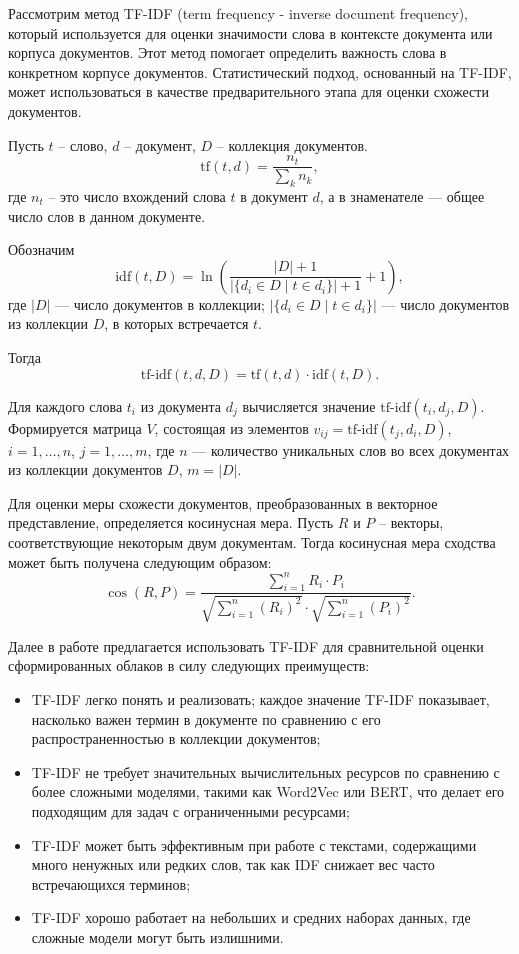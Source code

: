 \documentclass[bachelor, och, coursework ]{SCWorks}
\begin{document}
Рассмотрим метод TF-IDF (term frequency - inverse document frequency), который используется для оценки значимости слова в контексте документа или корпуса документов. Этот метод помогает определить важность слова в конкретном корпусе документов. Статистический подход, основанный на TF-IDF, может использоваться в качестве предварительного этапа для оценки схожести документов.


Пусть \( t \) – слово, \( d \) – документ, \( D \) – коллекция документов.
\[
\text{tf}(t,d) = \frac{n_t}{\sum_{k} n_k},
\]
где \( n_t \) – это число вхождений слова \( t \) в документ \( d \), а в знаменателе — общее число слов в данном документе.

Обозначим
\[
\text{idf}(t,D) = \ln \left( \frac{|D| + 1}{|\{d_i \in D \mid t \in d_i\}| + 1} + 1 \right),
\]
где \( |D| \) — число документов в коллекции; \( |\{d_i \in D \mid t \in d_i\}| \) — число документов из коллекции \( D \), в которых встречается \( t \).

Тогда
\[
\text{tf-idf}(t,d,D) = \text{tf}(t,d) \cdot \text{idf}(t,D).
\]

Для каждого слова \( t_i \) из документа \( d_j \) вычисляется значение \( \text{tf-idf}(t_i,d_j,D) \). Формируется матрица \( V \), состоящая из элементов \( v_{ij} = \text{tf-idf}(t_j, d_i, D) \), \( i = 1, \ldots, n \), \( j = 1, \ldots, m \), где \( n \) — количество уникальных слов во всех документах из коллекции документов \( D \), \( m = |D| \).

Для оценки меры схожести документов, преобразованных в векторное представление, определяется косинусная мера. Пусть \( R \) и \( P \) – векторы, соответствующие некоторым двум документам. Тогда косинусная мера сходства может быть получена следующим образом:
\[
\cos(R,P) = \frac{\sum_{i=1}^n R_i \cdot P_i}{\sqrt{\sum_{i=1}^n (R_i)^2} \cdot \sqrt{\sum_{i=1}^n (P_i)^2}}.
\]


Далее в работе предлагается использовать TF-IDF для сравнительной оценки сформированных облаков в силу следующих преимуществ:
\begin{itemize}
    \item TF-IDF легко понять и реализовать; каждое значение TF-IDF  показывает, насколько важен термин в документе по сравнению с его распространенностью в коллекции документов;
    \item TF-IDF не требует значительных вычислительных ресурсов по сравнению с более сложными моделями, такими как Word2Vec или BERT, что делает его подходящим для задач с ограниченными ресурсами;
    \item TF-IDF может быть эффективным при работе с текстами, содержащими много ненужных или редких слов, так как IDF снижает вес часто встречающихся терминов;
    \item TF-IDF хорошо работает на небольших и средних наборах данных, где сложные модели могут быть излишними.
\end{itemize}
\end{document}
